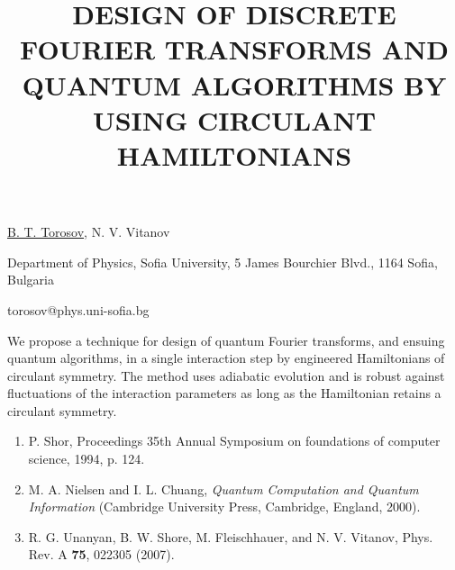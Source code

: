\title{DESIGN OF DISCRETE FOURIER TRANSFORMS AND QUANTUM \mbox{ALGORITHMS} BY USING CIRCULANT \mbox{HAMILTONIANS}}

\underline{B. T. Torosov}, N. V. Vitanov 

{\normalsize{\vspace{-4mm}
Department of Physics, Sofia University, 5 James Bourchier Blvd.,
1164 Sofia, Bulgaria

\email torosov@phys.uni-sofia.bg}}

We propose a technique for design of quantum Fourier transforms, and ensuing quantum algorithms, in a single interaction step
by engineered Hamiltonians of circulant symmetry. The method uses adiabatic evolution and is robust against fluctuations of the
interaction parameters as long as the Hamiltonian retains a circulant symmetry.

{\normalsize

\begin{enumerate}
\item P. Shor, Proceedings 35th Annual Symposium on foundations of
computer science, 1994, p. 124.

\item M. A. Nielsen and I. L. Chuang, \emph{Quantum
Computation and Quantum Information} (Cambridge University Press,
Cambridge, England, 2000).

\item R. G. Unanyan, B. W. Shore, M. Fleischhauer, and N. V. Vitanov,
Phys. Rev. A \textbf{75}, 022305 (2007).

\end{enumerate}

}

 \vspace{\baselineskip}